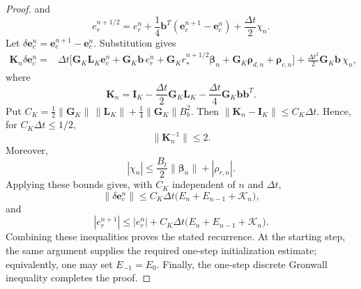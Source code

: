 \documentclass[10pt,reqno]{amsart}
\theoremstyle{remark}
\theoremstyle{definition}
\begin{document}
\begin{proof}
  and
  \begin{equation}
    e_r^{n+1/2}=e_r^n+\frac14\boldsymbol b^{T}(\boldsymbol e_c^{n+1}-\boldsymbol e_c^n)+\frac{\Delta t}{2}\chi_n.
    \label{eq:SM scalar recovery midpoint}
  \end{equation}
  Let $\delta\boldsymbol e_c^n=\boldsymbol e_c^{n+1}-\boldsymbol e_c^n$. Substitution gives
  \begin{equation}
    \begin{aligned}
      \boldsymbol{K}_n\delta\boldsymbol e_c^n={}&\Delta t\bigl[\boldsymbol{G}_K\boldsymbol{L}_K\boldsymbol e_c^n+\boldsymbol{G}_K\boldsymbol b\,e_r^n+\boldsymbol{G}_K r_*^{n+1/2}\boldsymbol\beta_n+\boldsymbol{G}_K\boldsymbol\rho_{d,n}+\boldsymbol\rho_{c,n}\bigr]+\frac{\Delta t^2}{2}\boldsymbol{G}_K\boldsymbol b\,\chi_n,
    \end{aligned}
    \label{eq:SM fixed-space increment equation}
  \end{equation}
  where
  \begin{equation}
    \boldsymbol{K}_n=\boldsymbol{I}_K-\frac{\Delta t}{2}\boldsymbol{G}_K\boldsymbol{L}_K-\frac{\Delta t}{4}\boldsymbol{G}_K\boldsymbol b\boldsymbol b^{T}.
    \label{eq:SM fixed-space matrix}
  \end{equation}
  Put $C_K=\frac12\|\boldsymbol{G}_K\|\,\|\boldsymbol{L}_K\|+\frac14\|\boldsymbol{G}_K\|B_b^2$. Then $\|\boldsymbol{K}_n-\boldsymbol{I}_K\|\leq C_K\Delta t$. Hence, for $C_K\Delta t\leq1/2$,
  \begin{equation}
    \|\boldsymbol{K}_n^{-1}\|\leq2.
    \label{eq:SM fixed-space inverse bound}
  \end{equation}
  Moreover,
  \begin{equation}
    |\chi_n|\leq\frac{B_t}{2}\|\boldsymbol\beta_n\|+|\rho_{r,n}|.
    \label{eq:SM chi estimate}
  \end{equation}
  Applying these bounds gives, with $C_K$ independent of $n$ and $\Delta t$,
  \begin{equation}
    \|\delta\boldsymbol e_c^n\|\leq C_K\Delta t\bigl(E_n+E_{n-1}+\mathcal K_n\bigr),
    \label{eq:SM coefficient increment bound}
  \end{equation}
  and
  \begin{equation}
    |e_r^{n+1}|\leq |e_r^n|+C_K\Delta t\bigl(E_n+E_{n-1}+\mathcal K_n\bigr).
    \label{eq:SM scalar increment bound}
  \end{equation}
  Combining these inequalities proves the stated recurrence. At the starting step, the same argument supplies the required one-step initialization estimate; equivalently, one may set $E_{-1}=E_0$. Finally, the one-step discrete Gronwall inequality completes the proof.
\end{proof}
\end{document}
